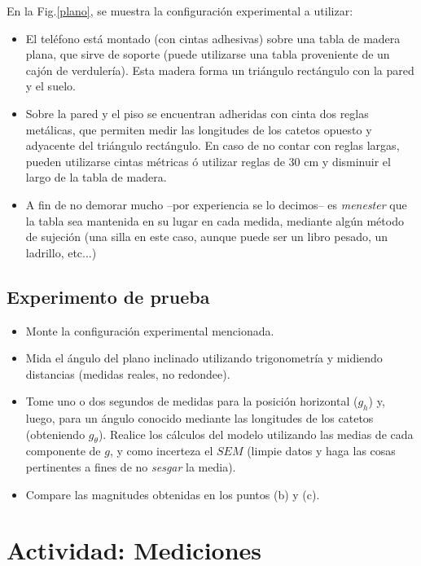 \documentclass[10pt,a4paper]{article}
\theoremstyle{definition}
\begin{document}
En la Fig.\eqref{plano}, se muestra la configuración experimental a utilizar:

\begin{itemize}
\item[$\bullet$] El teléfono está montado (con cintas adhesivas) sobre una tabla de madera plana, que sirve de soporte (puede utilizarse una tabla proveniente de un cajón de verdulería). Esta madera forma un triángulo rectángulo con la pared y el suelo.
\item[$\bullet$] Sobre la pared y el piso se encuentran adheridas con cinta dos reglas metálicas, que permiten medir las longitudes de los catetos opuesto y adyacente del triángulo rectángulo. En caso de no contar con reglas largas, pueden utilizarse cintas métricas ó utilizar reglas de 30 cm y disminuir el largo de la tabla de madera.
\item[$\bullet$] A fin de no demorar mucho --por experiencia se lo decimos-- es \textit{menester} que la tabla sea mantenida en su lugar en cada medida, mediante algún método de sujeción (una silla en este caso, aunque puede ser un libro pesado, un ladrillo, etc...)
\end{itemize}


\subsection{Experimento de prueba}
\begin{itemize}

\item[a)] Monte la configuración experimental mencionada.

\item[b)] Mida el ángulo del plano inclinado utilizando trigonometría y midiendo distancias (medidas reales, no redondee).

\item[c)] Tome uno o dos segundos de medidas para la posición horizontal ($g_h$) y, luego, para un ángulo conocido mediante las longitudes de los catetos (obteniendo $g_\theta$). Realice los cálculos del modelo utilizando las medias de cada componente de $g$, y como incerteza el $SEM$ (limpie datos y haga las cosas pertinentes a fines de no \textit{sesgar} la media). 

\item[d)] Compare las magnitudes obtenidas en los puntos (b) y (c). 
\end{itemize}

\section{Actividad: Mediciones}
\end{document}
